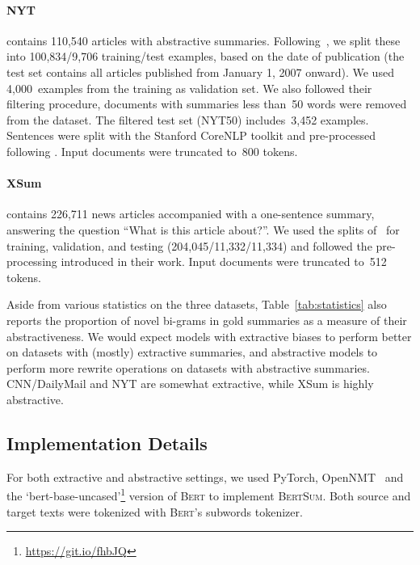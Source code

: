 \documentclass[11pt,a4paper]{article}
\begin{document}
    
    \vspace{-1ex}
    \paragraph{NYT} contains 110,540 articles with abstractive
    summaries. Following~\citet{durrett2016learning}, we split these
    into 100,834/9,706 training/test examples, based on the date of
    publication (the test set contains all articles published from
    January 1, 2007 onward).  We used 4,000~examples from the training
    as validation set.  We also followed their filtering procedure,
    documents with summaries less than~50 words were removed from the
    dataset.  The filtered test set (NYT50) includes~3,452 examples.
    Sentences were split with the Stanford CoreNLP toolkit
    \cite{manning-etal-2014-stanford} and pre-processed following
    \citet{durrett2016learning}.  Input documents were truncated
    to~800 tokens.
    
    \vspace{-1ex}
    \paragraph{XSum} contains 226,711 news articles accompanied with a
    one-sentence summary, answering the question ``What is this
    article about?''.  We used the splits of~\citet{xsum} for
    training, validation, and testing (204,045/11,332/11,334) and
    followed the pre-processing introduced in their work.  Input
    documents were truncated to~512 tokens.
    
    
    Aside from various statistics on the three datasets,
    Table~\ref{tab:statistics} also reports the proportion of novel
    bi-grams in gold summaries as a measure of their
    abstractiveness. We would expect models with extractive biases to
    perform better on datasets with (mostly) extractive summaries, and
    abstractive models to perform more rewrite operations on datasets
    with abstractive summaries. CNN/DailyMail and NYT are somewhat
    extractive, while XSum is highly abstractive.
    
    
    \subsection{Implementation Details} 
    For both extractive and abstractive settings, we used PyTorch,
    OpenNMT~\cite{klein2017opennmt} and the
    `bert-base-uncased'\footnote{\url{https://git.io/fhbJQ}} version of
    \textsc{Bert} to implement \textsc{BertSum}.  Both source and
    target texts were tokenized with \textsc{Bert}'s subwords tokenizer.
    
\end{document}
